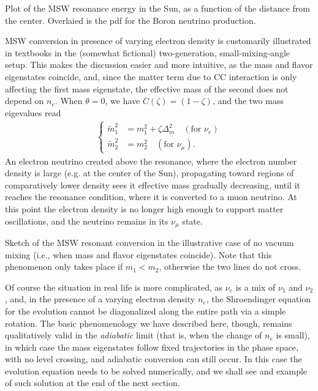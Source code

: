 \begin{marginfigure}
  
  \caption{Plot of the MSW resonance energy in the Sun, as a function of the distance
  from the center. Overlaied is the pdf for the Boron neutrino production.}
  \label{fig:msw_resonance_energy}
\end{marginfigure}

MSW conversion in presence of varying electron density is customarily illustrated in
textbooks in the (somewhat fictional) two-generation, small-mixing-angle setup. This
makes the discussion easier and more intuitive, as the mass and flavor eigenstates
coincide, and, since the matter term due to CC interaction is only affecting the
first mass eigenstate, the effective mass of the second does not depend
on $n_e$. When $\theta = 0$, we have $C(\zeta) = (1 - \zeta)$, and the two mass
eigevalues read
\begin{align*}
  \begin{cases}
  \tilde{m}_1^2 & = m_1^2 + \zeta \Delta_m^2 \quad (\text{for } \nu_e)\\
  \tilde{m}_2^2 & = m_2^2 \quad (\text{for } \nu_\mu).
\end{cases}
\end{align*}
An electron neutrino created above the resonance, where the electron number density
is large (e.g. at the center of the Sun), propagating toward regions of comparatively
lower density sees it effective mass gradually decreasing, until it reaches the
resonance condition, where it is converted to a muon neutrino. At this point the
electron density is no longer high enough to support matter oscillations, and the
neutrino remains in its $\nu_\mu$ state.

\begin{marginfigure}
  
  \caption{Sketch of the MSW resonant conversion in the illustrative case of no
  vacuum mixing (i.e., when mass and flavor eigenstates coincide). Note that
  this phenomenon only takes place if $m_1 < m_2$, otherwise the two lines do not
  cross.}
  \label{fig:msw_conversion}
\end{marginfigure}

Of course the situation in real life is more complicated, as $\nu_e$ is a mix of
$\nu_1$ and $\nu_2$, and, in the presence of a varying electron density $n_e$, the
Shroendinger equation for the evolution cannot be diagonalized along the entire path
via a simple rotation. The basic phenomenology we have described here, though,
remains qualitatively valid in the \emph{adiabatic} limit (that is, when the change
of $n_e$ is small), in which case the mass eigenstates follow fixed trajectories in the
phase space, with no level crossing, and adiabatic conversion can still occur.
In this case the evolution equation needs to be solved numerically, and we shall see
and example of such solution at the end of the next section.


